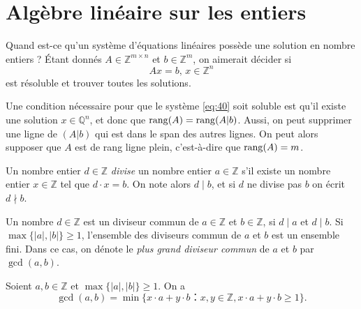 \chapter{Algèbre linéaire sur les entiers}
\label{cha:algebre-lineaire-sur}
 

Quand est-ce qu'un système d'équations linéaires possède une solution en nombre entiers ? Étant donnés $A ∈ℤ^{m × n}$ et $b ∈ℤ^m$, on aimerait décider si 
\begin{equation}
  \label{eq:40}
  A x = b, \, x ∈ ℤ^n 
\end{equation}
est résoluble et trouver toutes les solutions.



Une condition nécessaire pour que le système \eqref{eq:40} soit soluble est qu'il existe une solution $x ∈ℚ^n$, et donc que $\operatorname{rang}(A) = \operatorname{rang}(A|b)$. Aussi, on peut supprimer une ligne de $(A|b)$ qui est dans le span des autres lignes. On peut alors supposer que $A$ est de rang ligne plein, c'est-à-dire que $\operatorname{rang}(A) = m$. 

\begin{definition}
\label{def:59}
  Un nombre entier $d ∈ℤ$ \emph{divise} un nombre entier $a ∈ℤ$ s'il existe un nombre entier $x ∈ℤ$ tel que $d⋅x =b$. On note alors $d\mid b$, et si $d$ ne divise pas $b$ on écrit $d \nmid b$. 
\end{definition}
\begin{definition}
  \label{def:45}
  Un nombre $d ∈ℤ$ est un diviseur commun de $a∈ℤ$ et $b ∈ℤ$, si $d \mid a$ et $d \mid b$. Si $\max\{|a|,|b|\} ≥1$, l'ensemble des diviseurs commun de $a$ et $b$ est un ensemble fini. Dans ce cas, on dénote le \emph{plus grand diviseur commun} de $a$ et $b$ par $\gcd(a,b)$. 
\end{definition}


\begin{theorem}
  \label{thr:48}
  Soient $a,b ∈ℤ$ et $\max\{|a|,|b|\} ≥1$. On a
  \begin{displaymath}
    \gcd(a,b) = \min \{ x ⋅a + y ⋅ b： x,y ∈ℤ,  x ⋅a + y ⋅ b≥1\}.
  \end{displaymath}
\end{theorem}

